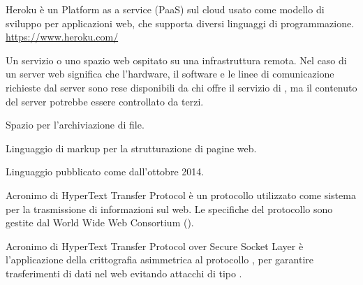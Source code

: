 Heroku è un Platform as a service (PaaS) sul cloud usato come modello di sviluppo per applicazioni web, che supporta diversi linguaggi di programmazione.\\
\url{https://www.heroku.com/}

Un servizio o uno spazio web ospitato su una infrastruttura remota.
Nel caso di un server web significa che l’hardware, il software e le linee di comunicazione richieste dal server sono rese disponibili da chi offre il servizio di , ma il contenuto del server potrebbe essere controllato da terzi.

Spazio per l’archiviazione di file.

Linguaggio di markup per la strutturazione di pagine web.

Linguaggio  pubblicato come  dall'ottobre 2014.

Acronimo di HyperText Transfer Protocol \`e un protocollo utilizzato come sistema per la trasmissione di informazioni sul web. Le specifiche del protocollo sono gestite dal World Wide Web Consortium ().

Acronimo di  HyperText Transfer Protocol over Secure Socket Layer \`e l'applicazione della crittografia asimmetrica al protocollo , per garantire trasferimenti di dati nel web evitando attacchi di tipo .
\clearpage